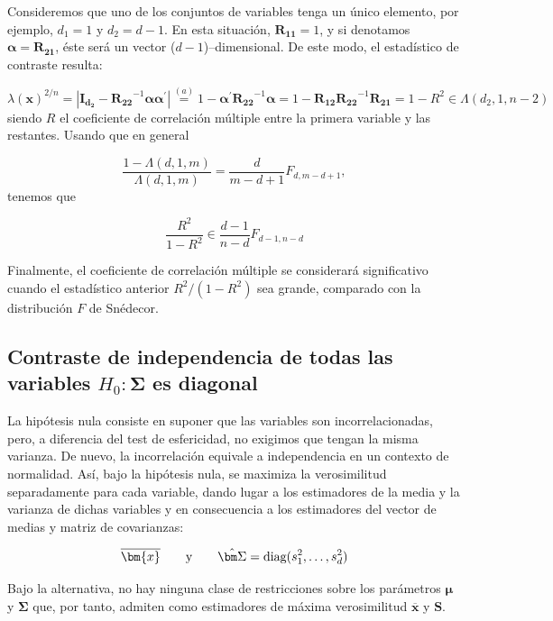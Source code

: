 \documentclass[
  a4paper,
  oneside]{scrbook}
\theoremstyle{definition}
\theoremstyle{definition}
\theoremstyle{definition}
\theoremstyle{definition}
\theoremstyle{remark}
\begin{document}
Consideremos que uno de los conjuntos de variables tenga un único
elemento, por ejemplo, \(d_1=1\) y \(d_2=d-1\). En esta situación,
\(\bm{R_{11}}=1\), y si denotamos \(\bm{\alpha}=\bm{R_{21}}\), éste será un
vector (\(d-1\))--dimensional. De este modo, el estadístico de contraste
resulta:

\[\lambda(\bm{x})^{2/n} = \left|{\bm{I_{d_2}}}-\bm{R_{22}}^{-1}\bm{\alpha}\bm{\alpha}^\prime{}\right|
\stackrel{(a)}{=} 1-\bm{\alpha}^\prime{}\bm{R_{22}}^{-1}\bm{\alpha}
= 1-\bm{R_{12}}\bm{R_{22}}^{-1}\bm{R_{21}} = 1-R^2\in \Lambda\left(d_2,1,n-2\right)\]
siendo \(R\) el coeficiente de correlación múltiple entre la primera
variable y las restantes. Usando que en general

\[\frac{1-\Lambda(d,1,m)}{\Lambda(d,1,m)}=\frac{d}{m-d+1}F_{d,m-d+1},\]
tenemos que

\[\frac{R^2}{1-R^2}\in \frac{d-1}{n-d}F_{d-1,n-d}\]

Finalmente, el coeficiente de correlación múltiple se considerará
significativo cuando el estadístico anterior \(R^2/(1-R^2)\) sea grande,
comparado con la distribución \(F\) de Snédecor.

\subsection{\texorpdfstring{Contraste de independencia de todas las variables \(H_0:\bm\Sigma\) es diagonal}{Contraste de independencia de todas las variables H\_0:\textbackslash bm\textbackslash Sigma es diagonal}}\label{contraste-de-independencia-de-todas-las-variables-h-0-bm-sigma-es-diagonal}

La hipótesis nula consiste en suponer que las variables son
incorrelacionadas, pero, a diferencia del test de esfericidad, no
exigimos que tengan la misma varianza. De nuevo, la incorrelación
equivale a independencia en un contexto de normalidad. Así, bajo la
hipótesis nula, se maximiza la verosimilitud separadamente para cada
variable, dando lugar a los estimadores de la media y la varianza de
dichas variables y en consecuencia a los estimadores del vector de
medias y matriz de covarianzas:

\[\overline{\bm{x}}\qquad \mbox{y} \qquad \hat{\bm\Sigma}=\textnormal{diag}(s_{1}^2, \ldots, s_d^2)\]

Bajo la alternativa, no hay ninguna clase de restricciones sobre los
parámetros \(\bm{\mu}\) y \(\bm\Sigma\) que, por tanto, admiten como
estimadores de máxima verosimilitud \(\overline{\bm{x}}\) y \(\bm{S}\).
\end{document}
